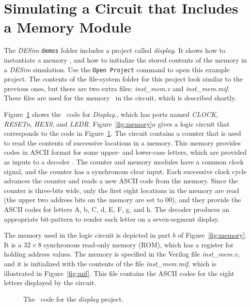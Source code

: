 \section{Simulating a Circuit that Includes a Memory Module}

The {\it DESim} \texttt{demos} folder includes a project called {\it display}. It shows how 
to instantiate a memory \hdlModuleName, and how to initialize the stored contents of 
the memory in a {\it DESim} simulation.  Use the \texttt{Open Project} command to open this
example project. The contents of the file-system folder for this project look similar to the 
previous ones, but there are two extra files: {\it inst\_mem.v} and {\it inst\_mem.mif}. These 
files are used for the memory \hdlModuleName~in the circuit, which is described shortly.

Figure~\ref{fig:display} shows the \hdlName~code for {\it Display.\hdlFileExt}, which 
has ports named {\it CLOCK}, {\it RESETn}, {\it HEX0}, and {\it LEDR}.
Figure~\ref{fig:memory}$a$ gives a logic circuit that corresponds to the code in 
Figure~\ref{fig:display}. The circuit contains a counter that is used to read the 
contents of successive locations in a memory. This memory provides codes in ASCII format 
for some upper- and lower-case letters, which are provided as inputs to a decoder \hdlModuleName. 
The counter and memory modules have a common clock signal, and the counter has a
synchronous clear input. Each successive clock cycle advances the counter and reads 
a new ASCII code from the memory. Since the counter is three-bits wide, only the first 
eight locations in the memory are read (the upper two address bits on the memory are set
to 00), and they provide the ASCII codes for letters A, b, C, d, E, F, g, and h. The 
decoder produces an appropriate bit-pattern to render each letter on a seven-segment display.

The memory used in the logic circuit is depicted in part $b$ of Figure~\ref{fig:memory}. It
is a $32 \times 8$ synchronous read-only memory (ROM), which has a register for holding 
address values. The memory is specified in the Verilog file {\it inst\_mem.v}, and it is 
initialized with the contents of the file {\it inst\_mem.mif},
which is illustrated in Figure~\ref{fig:mif}. This file contains the ASCII codes for the 
eight letters displayed by the circuit.

\begin{figure}[h]
\begin{center}
\begin{minipage}[h]{15 cm}
	{}
	{}
\end{minipage}
	\caption{The \hdlName~code for the {\it display} project.}
	\label{fig:display}
\end{center}
\end{figure}

